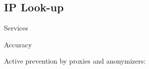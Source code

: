

\subsection{IP Look-up}

\begin{todos}
    \item Services
    \item Accuracy
    \item Active prevention by proxies and anonymizers: 
    \\  
    \\ 
    \\ 
\end{todos}

%
%


